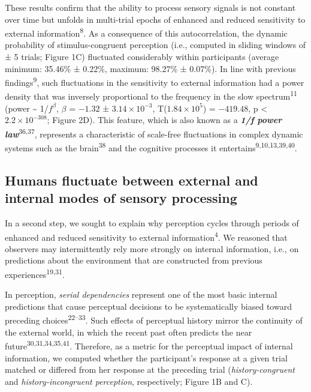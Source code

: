 \documentclass[
]{article}
\begin{document}
These results confirm that the ability to process sensory signals is not
constant over time but unfolds in multi-trial epochs of enhanced and
reduced sensitivity to external information\textsuperscript{8}. As a
consequence of this autocorrelation, the dynamic probability of
stimulus-congruent perception (i.e., computed in sliding windows of ± 5
trials; Figure 1C) fluctuated considerably within participants (average
minimum: 35.46\% ± 0.22\%, maximum: 98.27\% ± 0.07\%). In line with
previous findings\textsuperscript{9}, such fluctuations in the
sensitivity to external information had a power density that was
inversely proportional to the frequency in the slow
spectrum\textsuperscript{11} (power \textasciitilde{} 1/\(f^\beta\),
\(\beta\) = \(-1.32\) ± \(\ensuremath{3.14\times 10^{-3}}\),
T(\(\ensuremath{1.84\times 10^{5}}\)) = \(-419.48\), p < \(\ensuremath{2.2\times 10^{-308}}\); Figure
2D). This feature, which is also known as a \textbf{\emph{1/f power
law}}\textsuperscript{36,37}, represents a characteristic of scale-free
fluctuations in complex dynamic systems such as the
brain\textsuperscript{38} and the cognitive processes it
entertains\textsuperscript{9,10,13,39,40}.

\hypertarget{humans-fluctuate-between-external-and-internal-modes-of-sensory-processing}{%
\subsection{Humans fluctuate between external and internal modes of
sensory
processing}\label{humans-fluctuate-between-external-and-internal-modes-of-sensory-processing}}

In a second step, we sought to explain why perception cycles through
periods of enhanced and reduced sensitivity to external
information\textsuperscript{4}. We reasoned that observers may
intermittently rely more strongly on internal information, i.e., on
predictions about the environment that are constructed from previous
experiences\textsuperscript{19,31}.

In perception, \emph{serial dependencies} represent one of the most
basic internal predictions that cause perceptual decisions to be
systematically biased toward preceding choices\textsuperscript{22--33}.
Such effects of perceptual history mirror the continuity of the external
world, in which the recent past often predicts the near
future\textsuperscript{30,31,34,35,41}. Therefore, as a metric for the
perceptual impact of internal information, we computed whether the
participant's response at a given trial matched or differed from her
response at the preceding trial (\emph{history-congruent} and
\emph{history-incongruent perception}, respectively; Figure 1B and C).
\end{document}
